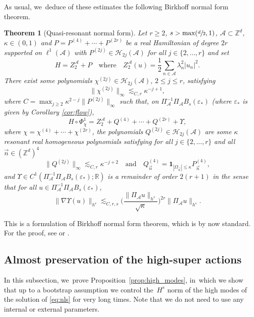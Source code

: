 \documentclass[10pt,a4paper]{amsart}
\theoremstyle{plain}
\newtheorem{theorem}{Theorem}[section]
\theoremstyle{definition}
\newcommand{\1}{\mathbf{1}}
\begin{document}
As usual, we~deduce of these estimates the following Birkhoff normal form theorem.
\begin{theorem}[Quasi-resonant normal form]
\label{thm:res-nf} Let $r\geq2$, $s> \max(\sfrac{d}{2},1)$, $\mathcal{A} \subset \mathbb{Z}^d$, $\kappa \in (0,1)$ and $P = P^{(4)} + \cdots + P^{(2r)}$ be a real Hamiltonian of degree $2r$ supported on $\ell^1(\mathcal{A})$ with $P^{(2j)} \in \mathcal{H}_{2j}(\mathcal{A})$ for all $j\in \{ 2,\dots,r \}$ and set
\[
H = Z_2^{\mathcal{A}} + P \quad \mathrm{where } \quad Z_2^{\mathcal{A}}(u) = \frac12\sum_{n\in \mathcal{A}} \lambda_n^2 |u_n|^2.
\]
There exist some polynomials $\chi^{(2j)} \in \mathcal{H}_{2j}(\mathcal{A})$, $2\leq j \leq r$, satisfying
\[
\| \chi^{(2j)} \|_{\infty} \lesssim_{ C,r} \kappa^{-j+1},
\]
where $C = \max_{j\geq 2} \kappa^{2-j}\| P^{(2j)} \|_{\infty}$ such that, on $\Pi_{\mathcal{A}}^{-1}\Pi_{\mathcal{A}}B_s(\varepsilon_*) $ (where $\varepsilon_*$ is given by Corollary \ref{cor:flow}),
\[
H\circ \Phi_{\chi}^1 = Z_2^{\mathcal{A}} + Q^{(4)} + \cdots+ Q^{(2r)} + \Upsilon,
\]
where $\chi = \chi^{(4)} + \cdots + \chi^{(2r)}$, the polynomials $Q^{(2j)} \in \mathcal{H}_{2j}(\mathcal{A})$ are some $\kappa$ resonant real homogeneous polynomials satisfying for all $j\in \{2,\dots,r\}$ and all $\vec{n} \in (\mathbb{Z}^d)^4$
\[
\| Q^{(2j)} \|_{\infty} \lesssim_{C,r} \kappa^{-j+2} \quad \mathrm{and} \quad Q^{(4)}_{\vec{n}} = \mathbf{1}_{|\Omega_{\vec{n}}| \leq \kappa} P^{(4)}_{\vec{n}},
\]
and $\Upsilon \in C^1(\Pi_{\mathcal{A}}^{-1}\Pi_{\mathcal{A}}B_s(\varepsilon_*);\mathbb{R})$ is a remainder of order $2(r+1)$ in the sense that for all $u\in \Pi_{\mathcal{A}}^{-1}\Pi_{\mathcal{A}}B_s(\varepsilon_*)$,
\begin{equation}
\label{eq:R-res}
\|\nabla \Upsilon(u)\|_{h^{s}}\lesssim_{C,r,s} \Big(\frac{\| \Pi_{\mathcal{A}} u\|_{h^{s}}}{\sqrt{\kappa}} \Big)^{2r}\|\Pi_{\mathcal{A}} u\|_{h^{s}}.
\end{equation}
\end{theorem}
This is a formulation of Birkhoff normal form theorem, which is by now standard. For the proof, see \cite[Th.\,2.15]{BG22} or \cite[Th.\,2.12]{BGR23}.

\subsection{Almost preservation of the high-super actions}
In this subsection, we~prove Proposition~\ref{prop:high_modes}, in~which we show that up to a bootstrap assumption we control the~$H^s$ norm of the high modes of the solution of \eqref{eq:nls} for very long times. Note that we do not need to use any internal or external parameters.
\end{document}

